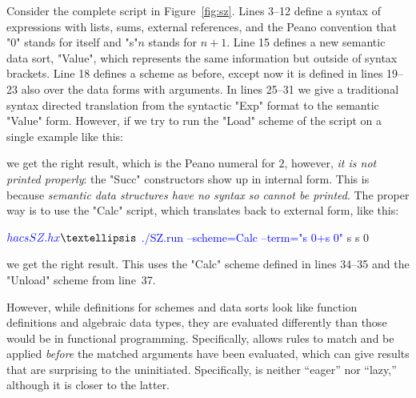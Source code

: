 \documentclass[11pt]{article} %
\begin{document}
\begin{example}
  Consider the complete \HAX script in Figure~\ref{fig:sz}. Lines 3--12 define a syntax of
  expressions with lists, sums, external references, and the Peano convention that "0" stands for
  itself and "s"$n$ stands for $n+1$. Line 15 defines a new semantic data sort, "Value", which
  represents the same information but outside of syntax brackets. Line 18 defines a scheme as
  before, except now it is defined in lines 19--23 also over the data forms with arguments. In lines
  25--31 we give a traditional syntax directed translation from the syntactic "Exp" format to the
  semantic "Value" form. However, if we try to run the "Load" scheme of the script on a single
  example like this:
  we get the right result, which is the Peano numeral for $2$, however, \emph{it is not printed
    properly}: the "Succ" constructors show up in internal form. This is because \emph{semantic data
    structures have no syntax so cannot be printed}. The proper way is to use the "Calc" script,
  which translates back to external form, like this:
  \begin{code}[commandchars=\\\{\}]
$ \textcolor{blue}{hacs SZ.hx}
…
$ \textcolor{blue}{./SZ.run --scheme=Calc --term="s 0+s 0"}
 s  s  0   
  \end{code}
  we get the right result. This uses the "Calc" scheme defined in lines 34--35 and the "Unload"
  scheme from line~37.
\end{example}

However, while \HAX definitions for schemes and data sorts look like function definitions and
algebraic data types, they are evaluated differently than those would be in functional programming.
Specifically, \HAX allows rules to match and be applied \emph{before} the matched arguments have
been evaluated, which can give results that are surprising to the uninitiated. Specifically, \HAX is
neither ``eager'' nor ``lazy,'' although it is closer to the latter.
\end{document}
